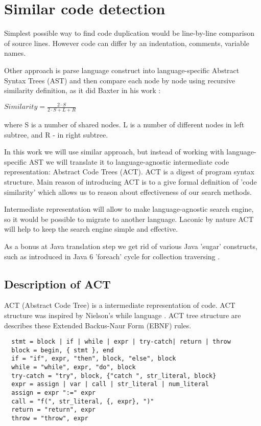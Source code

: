 \section{Similar code detection}

Simplest possible way to find code duplication would be line-by-line comparison of source lines.
However code can differ by an indentation, comments, variable names. 

Other approach is parse language construct into language-specific Abstract 
Syntax Trees (AST) and then compare each node by node using recursive similarity
definition, as it did Baxter in his work \cite{Baxter&al1998}:

\begin{math}
Similarity =  \frac{ 2 \cdot S}{2 \cdot S + L + R}
\end{math}

where S is a number of shared nodes. L is a number of different nodes in left subtree,
and R - in right subtree.

In this work we will use similar approach, but instead of working with language-specific AST we will translate it to
language-agnostic intermediate code representation: Abstract Code Trees (ACT).
ACT is a digest of program syntax structure.
Main reason of introducing ACT is to a give formal definition of 'code similarity' which allows us to reason about
effectiveness of our search methods.

Intermediate representation will allow to make language-agnostic search engine, so it would be possible to migrate to
another language.
Laconic by nature ACT will help to keep the search engine simple and effective. 

As a bonus at Java translation step we get rid of various Java 'sugar' constructs,
such as introduced in Java 6 'foreach' cycle for collection traversing \cite{gosling05}.

\subsection{Description of ACT}

ACT (Abstract Code Tree) is a intermediate representation of code.
ACT structure was inspired by Nielson's while language \cite{Nielson&Nielson93}.
ACT tree structure are describes these Extended Backus-Naur Form (EBNF)\cite{ISO1996} rules. 

\begin{verbatim}
  stmt = block | if | while | expr | try-catch| return | throw
  block = begin, { stmt }, end
  if = "if", expr, "then", block, "else", block
  while = "while", expr, "do", block
  try-catch = "try", block, {"catch ", str_literal, block}
  expr = assign | var | call | str_literal | num_literal
  assign = expr ":=" expr
  call = "f(", str_literal, {, expr}, ")"
  return = "return", expr
  throw = "throw", expr
\end{verbatim}

